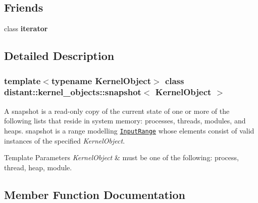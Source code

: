 \subsection*{Friends}
\begin{DoxyCompactItemize}
\item 
\mbox{\label{classdistant_1_1kernel__objects_1_1snapshot_a67171474c4da6cc8efe0c7fafefd2b2d}} 
class {\bfseries iterator}
\end{DoxyCompactItemize}


\subsection{Detailed Description}
\subsubsection*{template$<$typename Kernel\+Object$>$\newline
class distant\+::kernel\+\_\+objects\+::snapshot$<$ Kernel\+Object $>$}

A snapshot is a read-\/only copy of the current state of one or more of the following lists that reside in system memory\+: processes, threads, modules, and heaps. snapshot is a range modelling \href{http://en.cppreference.com/w/cpp/experimental/ranges/range/InputRange}{\tt Input\+Range} whose elements consist of valid instances of the specified {\itshape Kernel\+Object}. 


\begin{DoxyTemplParams}{Template Parameters}
{\em Kernel\+Object} & must be one of the following\+: process, thread, heap, module. \\
\hline
\end{DoxyTemplParams}


\subsection{Member Function Documentation}
\mbox{\label{classdistant_1_1kernel__objects_1_1snapshot_a6e9d7ef5c4273d1dde5fee1055a63b7a}} 
